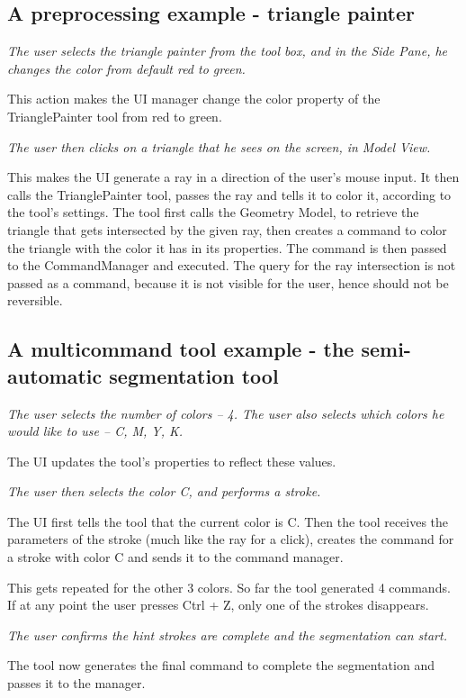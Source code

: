 \subsection{A preprocessing example - triangle painter}
\textit{The user selects the triangle painter from the tool box, and in the Side Pane, he changes the color from default red to green.}

This action makes the UI manager change the color property of the TrianglePainter tool from red to green.

\textit{The user then clicks on a triangle that he sees on the screen, in Model View.}

This makes the UI generate a ray in a direction of the user's mouse input. It then calls the TrianglePainter tool, passes the ray and tells it to color it, according to the tool's settings. The tool first calls the Geometry Model, to retrieve the triangle that gets intersected by the given ray, then creates a command to color the triangle with the color it has in its properties. The command is then passed to the CommandManager and executed. The query for the ray intersection is not passed as a command, because it is not visible for the user, hence should not be reversible.

\subsection{A multicommand tool example - the semi-automatic segmentation tool}
\textit{The user selects the number of colors -- 4. The user also selects which colors he would like to use -- C, M, Y, K.}

The UI updates the tool's properties to reflect these values.

\textit{The user then selects the color C, and performs a stroke.}

The UI first tells the tool that the current color is C. Then the tool receives the parameters of the stroke (much like the ray for a click), creates the command for a stroke with color C and sends it to the command manager.

This gets repeated for the other 3 colors. So far the tool generated 4 commands. If at any point the user presses Ctrl + Z, only one of the strokes disappears.

\textit{The user confirms the hint strokes are complete and the segmentation can start.}

The tool now generates the final command to complete the segmentation and passes it to the manager.


